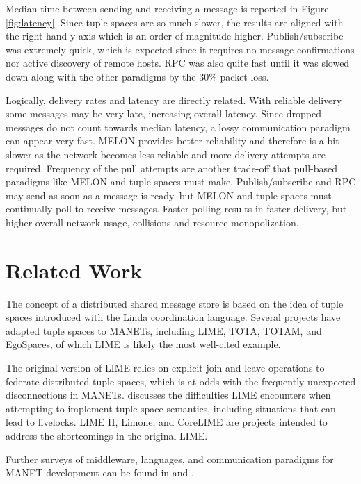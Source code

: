 \documentclass{llncs}
\begin{document}
Median time between sending and receiving a message is reported in Figure \ref{fig:latency}. Since tuple spaces are so much slower, the results are aligned with the right-hand y-axis which is an order of magnitude higher. Publish/subscribe was extremely quick, which is expected since it requires no message confirmations nor active discovery of remote hosts. RPC was also quite fast until it was slowed down along with the other paradigms by the 30\% packet loss.

Logically, delivery rates and latency are directly related. With reliable delivery some messages may be very late, increasing overall latency. Since dropped messages do not count towards median latency, a lossy communication paradigm can appear very fast. MELON provides better reliability and therefore is a bit slower as the network becomes less reliable and more delivery attempts are required. Frequency of the pull attempts are another trade-off that pull-based paradigms like MELON and tuple spaces must make. Publish/subscribe and RPC may send as soon as a message is ready, but MELON and tuple spaces must continually poll to receive messages. Faster polling results in faster delivery, but higher overall network usage, collisions and resource monopolization.

\section{Related Work}\label{sec:relatedwork}

The concept of a distributed shared message store is based on the idea of tuple spaces introduced with the Linda\cite{linda} coordination language. Several projects have adapted tuple spaces to MANETs, including LIME\cite{lime}, TOTA\cite{tota}, TOTAM\cite{totam}, and EgoSpaces\cite{egospaces}, of which LIME is likely the most well-cited example.

The original version of LIME relies on explicit join and leave operations to federate distributed tuple spaces, which is at odds with the frequently unexpected disconnections in MANETs. \cite{limerevisted} discusses the difficulties LIME encounters when attempting to implement tuple space semantics, including situations that can lead to livelocks. LIME II\cite{lime2}, Limone\cite{limone}, and CoreLIME\cite{corelime} are projects intended to address the shortcomings in the original LIME.

Further surveys of middleware, languages, and communication paradigms for MANET development can be found in \cite{mine} and \cite{mwtrends}.
\end{document}
